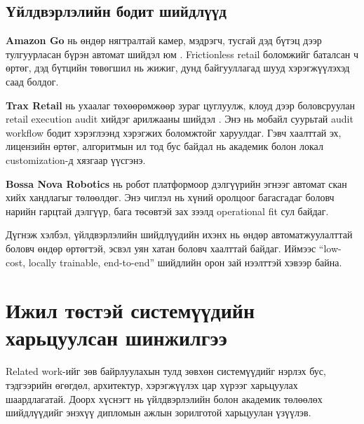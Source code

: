 \subsection{Үйлдвэрлэлийн бодит шийдлүүд}
\textbf{Amazon Go} нь өндөр нягтралтай камер, мэдрэгч, тусгай дэд бүтэц дээр тулгуурласан бүрэн автомат шийдэл юм \cite{amazon_go}. Frictionless retail боломжийг баталсан ч өртөг, дэд бүтцийн төвөгшил нь жижиг, дунд байгууллагад шууд хэрэгжүүлэхэд саад болдог.

\textbf{Trax Retail} нь ухаалаг төхөөрөмжөөр зураг цуглуулж, клоуд дээр боловсруулан retail execution audit хийдэг арилжааны шийдэл \cite{trax_retail}. Энэ нь мобайл суурьтай audit workflow бодит хэрэглээнд хэрэгжих боломжтойг харуулдаг. Гэвч хаалттай эх, лицензийн өртөг, алгоритмын ил тод бус байдал нь академик болон локал customization-д хязгаар үүсгэнэ.

\textbf{Bossa Nova Robotics} нь робот платформоор дэлгүүрийн эгнээг автомат скан хийх хандлагыг төлөөлдөг. Энэ чиглэл нь хүний оролцоог багасгадаг боловч нарийн гарцтай дэлгүүр, бага төсөвтэй зах зээлд operational fit сул байдаг.

Дүгнэж хэлбэл, үйлдвэрлэлийн шийдлүүдийн ихэнх нь өндөр автоматжуулалттай боловч өндөр өртөгтэй, эсвэл уян хатан боловч хаалттай байдаг. Иймээс ``low-cost, locally trainable, end-to-end'' шийдлийн орон зай нээлттэй хэвээр байна.

\section{Ижил төстэй системүүдийн харьцуулсан шинжилгээ}
Related work-ийг зөв байрлуулахын тулд зөвхөн системүүдийг нэрлэх бус, тэдгээрийн өгөгдөл, архитектур, хэрэгжүүлэх цар хүрээг харьцуулах шаардлагатай. Доорх хүснэгт нь үйлдвэрлэлийн болон академик төлөөлөх шийдлүүдийг энэхүү дипломын ажлын зорилготой харьцуулан үзүүлэв.

